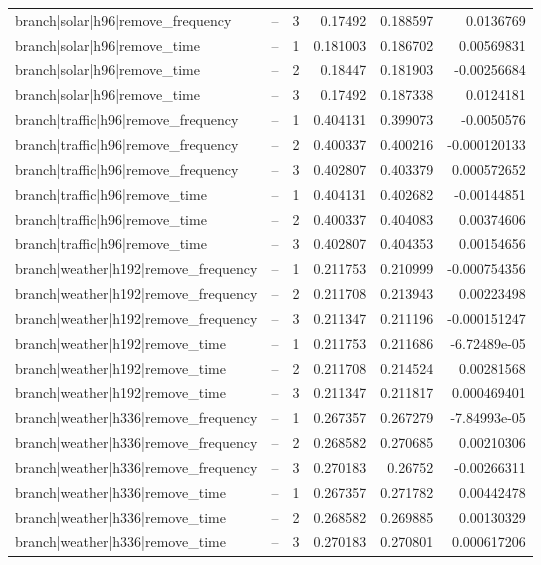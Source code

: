 \begin{longtable}{llrrrr}
branch|solar|h96|remove\_frequency & -- & 3 & 0.17492 & 0.188597 & 0.0136769 \\
branch|solar|h96|remove\_time & -- & 1 & 0.181003 & 0.186702 & 0.00569831 \\
branch|solar|h96|remove\_time & -- & 2 & 0.18447 & 0.181903 & -0.00256684 \\
branch|solar|h96|remove\_time & -- & 3 & 0.17492 & 0.187338 & 0.0124181 \\
branch|traffic|h96|remove\_frequency & -- & 1 & 0.404131 & 0.399073 & -0.0050576 \\
branch|traffic|h96|remove\_frequency & -- & 2 & 0.400337 & 0.400216 & -0.000120133 \\
branch|traffic|h96|remove\_frequency & -- & 3 & 0.402807 & 0.403379 & 0.000572652 \\
branch|traffic|h96|remove\_time & -- & 1 & 0.404131 & 0.402682 & -0.00144851 \\
branch|traffic|h96|remove\_time & -- & 2 & 0.400337 & 0.404083 & 0.00374606 \\
branch|traffic|h96|remove\_time & -- & 3 & 0.402807 & 0.404353 & 0.00154656 \\
branch|weather|h192|remove\_frequency & -- & 1 & 0.211753 & 0.210999 & -0.000754356 \\
branch|weather|h192|remove\_frequency & -- & 2 & 0.211708 & 0.213943 & 0.00223498 \\
branch|weather|h192|remove\_frequency & -- & 3 & 0.211347 & 0.211196 & -0.000151247 \\
branch|weather|h192|remove\_time & -- & 1 & 0.211753 & 0.211686 & -6.72489e-05 \\
branch|weather|h192|remove\_time & -- & 2 & 0.211708 & 0.214524 & 0.00281568 \\
branch|weather|h192|remove\_time & -- & 3 & 0.211347 & 0.211817 & 0.000469401 \\
branch|weather|h336|remove\_frequency & -- & 1 & 0.267357 & 0.267279 & -7.84993e-05 \\
branch|weather|h336|remove\_frequency & -- & 2 & 0.268582 & 0.270685 & 0.00210306 \\
branch|weather|h336|remove\_frequency & -- & 3 & 0.270183 & 0.26752 & -0.00266311 \\
branch|weather|h336|remove\_time & -- & 1 & 0.267357 & 0.271782 & 0.00442478 \\
branch|weather|h336|remove\_time & -- & 2 & 0.268582 & 0.269885 & 0.00130329 \\
branch|weather|h336|remove\_time & -- & 3 & 0.270183 & 0.270801 & 0.000617206 \\

\end{longtable}
